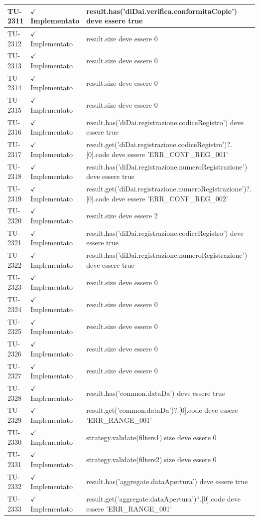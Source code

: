 ﻿\documentclass[a4paper,12pt]{article}
\newcommand{\ok}{\textcolor{green!60!black}{$\checkmark$ Implementato}}
\begin{document}
\begin{longtable}{|p{2cm}|p{3.5cm}|p{9.5cm}|}
\hline
TU-2311 & \ok & result.has('diDai.verifica.conformitaCopie') deve essere true \\
\hline
TU-2312 & \ok & result.size deve essere 0 \\
\hline
TU-2313 & \ok & result.size deve essere 0 \\
\hline
TU-2314 & \ok & result.size deve essere 0 \\
\hline
TU-2315 & \ok & result.size deve essere 0 \\
\hline
TU-2316 & \ok & result.has('diDai.registrazione.codiceRegistro') deve essere true \\
\hline
TU-2317 & \ok & result.get('diDai.registrazione.codiceRegistro')?.[0].code deve essere 'ERR\_CONF\_REG\_001' \\
\hline
TU-2318 & \ok & result.has('diDai.registrazione.numeroRegistrazione') deve essere true \\
\hline
TU-2319 & \ok & result.get('diDai.registrazione.numeroRegistrazione')?.[0].code deve essere 'ERR\_CONF\_REG\_002' \\
\hline
TU-2320 & \ok & result.size deve essere 2 \\
\hline
TU-2321 & \ok & result.has('diDai.registrazione.codiceRegistro') deve essere true \\
\hline
TU-2322 & \ok & result.has('diDai.registrazione.numeroRegistrazione') deve essere true \\
\hline
TU-2323 & \ok & result.size deve essere 0 \\
\hline
TU-2324 & \ok & result.size deve essere 0 \\
\hline
TU-2325 & \ok & result.size deve essere 0 \\
\hline
TU-2326 & \ok & result.size deve essere 0 \\
\hline
TU-2327 & \ok & result.size deve essere 0 \\
\hline
TU-2328 & \ok & result.has('common.dataDa') deve essere true \\
\hline
TU-2329 & \ok & result.get('common.dataDa')?.[0].code deve essere 'ERR\_RANGE\_001' \\
\hline
TU-2330 & \ok & strategy.validate(filters1).size deve essere 0 \\
\hline
TU-2331 & \ok & strategy.validate(filters2).size deve essere 0 \\
\hline
TU-2332 & \ok & result.has('aggregate.dataApertura') deve essere true \\
\hline
TU-2333 & \ok & result.get('aggregate.dataApertura')?.[0].code deve essere 'ERR\_RANGE\_001' \\

\end{longtable}
\end{document}
